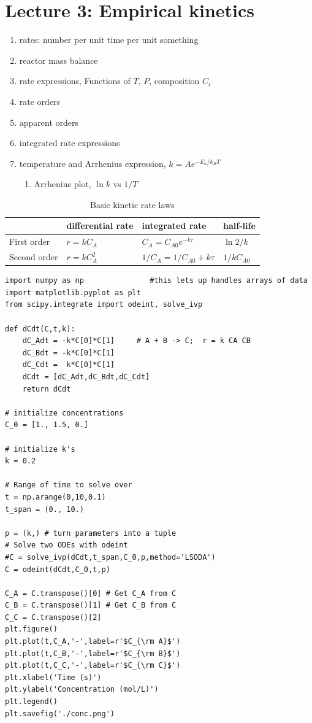\documentclass[11pt]{article}
\begin{document}
\section{Lecture 3: Empirical kinetics}
\label{sec:org018a727}
\begin{enumerate}
\item rates: number per unit time per unit something
\item reactor mass balance
\item rate expressions, Functions of \(T\), \(P\), composition \(C_i\)
\item rate orders
\item apparent orders
\item integrated rate expressions
\item temperature and Arrhenius expression, \(k=A e^{-E_a/k_BT}\)
\begin{enumerate}
\item Arrhenius plot, \(\ln k\) vs \(1/T\)
\end{enumerate}
\end{enumerate}

\begin{table}[htbp]
\caption{Basic kinetic rate laws}
\centering
\begin{tabular}{llll}
\hline
 & differential rate & integrated rate & half-life\\
\hline
First order & \(r = kC_A\) & \(C_A = C_{A0} e^{-k \tau}\) & \(\ln 2/k\)\\
Second order & \(r = kC_A^2\) & \(1/C_A = 1/C_{A0} + k \tau\) & \(1/kC_{A0}\)\\
\end{tabular}
\end{table}


\begin{verbatim}
import numpy as np               #this lets up handles arrays of data
import matplotlib.pyplot as plt
from scipy.integrate import odeint, solve_ivp

def dCdt(C,t,k):
    dC_Adt = -k*C[0]*C[1]     # A + B -> C;  r = k CA CB
    dC_Bdt = -k*C[0]*C[1]
    dC_Cdt =  k*C[0]*C[1]
    dCdt = [dC_Adt,dC_Bdt,dC_Cdt] 
    return dCdt

# initialize concentrations
C_0 = [1., 1.5, 0.]

# initialize k's
k = 0.2

# Range of time to solve over
t = np.arange(0,10,0.1) 
t_span = (0., 10.)

p = (k,) # turn parameters into a tuple
# Solve two ODEs with odeint
#C = solve_ivp(dCdt,t_span,C_0,p,method='LSODA')
C = odeint(dCdt,C_0,t,p)

C_A = C.transpose()[0] # Get C_A from C
C_B = C.transpose()[1] # Get C_B from C
C_C = C.transpose()[2]
plt.figure()
plt.plot(t,C_A,'-',label=r'$C_{\rm A}$')
plt.plot(t,C_B,'-',label=r'$C_{\rm B}$')
plt.plot(t,C_C,'-',label=r'$C_{\rm C}$')
plt.xlabel('Time (s)')
plt.ylabel('Concentration (mol/L)')
plt.legend()
plt.savefig('./conc.png')
\end{verbatim}
\end{document}
